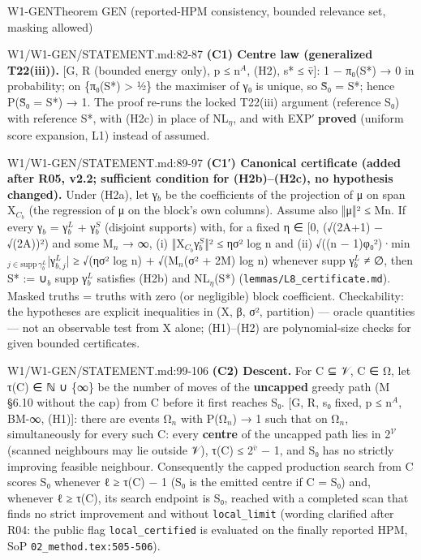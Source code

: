 \begin{card}{W1-GEN}{Theorem GEN (reported-HPM consistency, bounded relevance set, masking allowed)}
\begin{stmt}{W1/W1-GEN/STATEMENT.md:82-87}
\textbf{(C1) Centre law (generalized T22(iii)).} [G, R (bounded energy only), p ≤ n$^{A}$, (H2), s* ≤ v̄]: 1 − π₀(S*) → 0 in
probability; on \{π₀(S*) > ½\} the maximiser of γ₀ is unique, so S̃₀ = S*; hence P(S̃₀ = S*) → 1. The proof re-runs
the locked T22(iii) argument (reference S₀) with reference S*, with (H2c) in place of NL$_{\eta}$, and with EXP′ \textbf{proved}
(uniform score expansion, L1) instead of assumed.
\end{stmt}
\begin{stmt}{W1/W1-GEN/STATEMENT.md:89-97}
\textbf{(C1′) Canonical certificate (added after R05, v2.2; sufficient condition for (H2b)–(H2c), no hypothesis changed).}
Under (H2a), let γ$_{b}$ be the coefficients of the projection of μ on span X$_{C_b}$ (the regression of μ on the block's own
columns). Assume also ‖μ‖² ≤ Mn. If every γ$_{b}$ = γ$^{L}_{b}$ + γ$^{S}_{b}$ (disjoint supports) with, for a fixed
η ∈ [0, (√(2A+1) − √(2A))²) and some M$_{n}$ → ∞, (i) ‖X$_{C_b}$γ$^{S}_{b}$‖² ≤ ησ² log n and (ii)
√((n − 1)φ₀²)·min$_{j\in \mathrm{supp}\,\gamma^L_b}$|γ$^{L}_{b,j}$| ≥ √(ησ² log n) + √(M$_{n}$(σ² + 2M) log n) whenever supp γ$^{L}_{b}$ ≠ ∅,
then S* := ∪$_{b}$ supp γ$^{L}_{b}$
satisfies (H2b) and NL$_{\eta}$(S*) (\texttt{lemmas/L8\_certificate.md}). Masked truths = truths with zero (or negligible) block
coefficient. Checkability: the hypotheses are explicit inequalities in (X, β, σ², partition) — oracle quantities —
not an observable test from X alone; (H1)–(H2) are polynomial-size checks for given bounded certificates.
\end{stmt}
\begin{stmt}{W1/W1-GEN/STATEMENT.md:99-106}
\textbf{(C2) Descent.} For C ⊆ 𝒱, C ∈ Ω, let τ(C) ∈ ℕ ∪ \{∞\} be the number of moves of the \textbf{uncapped} greedy path
(M §6.10 without the cap) from C before it first reaches S₀. [G, R, s₀ fixed, p ≤ n$^{A}$, BM-∞, (H1)]: there are events
Ω$_{n}$ with P(Ω$_{n}$) → 1 such that on Ω$_{n}$, simultaneously for every such C: every \textbf{centre} of the uncapped path lies in
2$^{\mathcal{V}}$ (scanned neighbours may lie outside 𝒱), τ(C) ≤ 2$^{\bar{v}}$ − 1, and S₀ has no strictly improving feasible neighbour.
Consequently the capped production search from C scores S₀ whenever ℓ ≥ τ(C) − 1 (S₀ is the emitted centre if
C = S₀) and, whenever ℓ ≥ τ(C), its search endpoint is S₀, reached with a completed scan that finds no strict
improvement and without \texttt{local\_limit} (wording clarified after R04: the public flag \texttt{local\_certified} is evaluated on
the finally reported HPM, SoP \texttt{02\_method.tex:505-506}).

\end{stmt}
\end{card}
